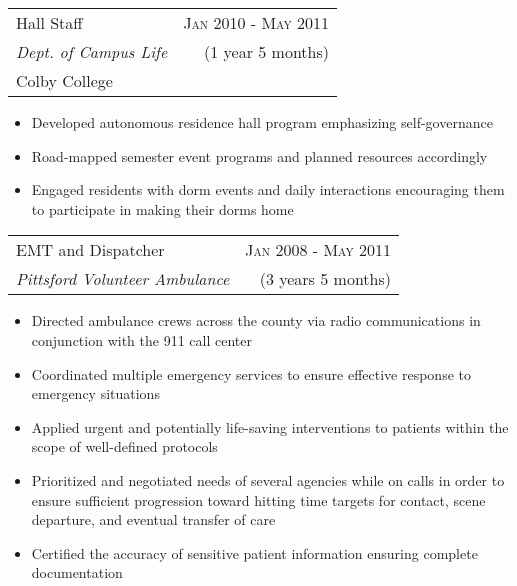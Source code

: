 \documentclass[10pt]{article} %
\begin{document}
{\begin{minipage}[t]{0.5\textwidth}
\begin{tabularx}{\linewidth}{ X r }
  {\large Hall Staff } & {\textsc{Jan 2010 - May 2011}} \\
  {\small{\textit{Dept. of Campus Life}}} & {\small{(1 year 5 months)}} \\
  {\small{Colby College}} 
\end{tabularx}
\begin{itemize}
  \item Developed autonomous residence hall program emphasizing self-governance
  \item Road-mapped semester event programs and planned resources accordingly
  \item Engaged residents with dorm events and daily interactions encouraging them to participate in making their dorms home
\end{itemize}


\begin{tabularx}{\linewidth}{ X r }
  {\large EMT and Dispatcher } & {\textsc{Jan 2008 - May 2011}} \\
  {\small\textit{Pittsford Volunteer Ambulance}} & {\small{(3 years 5 months)}}
\end{tabularx}
\begin{itemize}
  \item Directed ambulance crews across the county via radio communications in conjunction with the 911 call center
  \item Coordinated multiple emergency services to ensure effective response to emergency situations
  \item Applied urgent and potentially life-saving interventions to patients within the scope of well-defined protocols
  \item Prioritized and negotiated needs of several agencies while on calls in order to ensure sufficient progression toward hitting time targets for contact, scene departure, and eventual transfer of care
  \item Certified the accuracy of sensitive patient information ensuring complete documentation
\end{itemize}



\end{minipage}}
\end{document}
